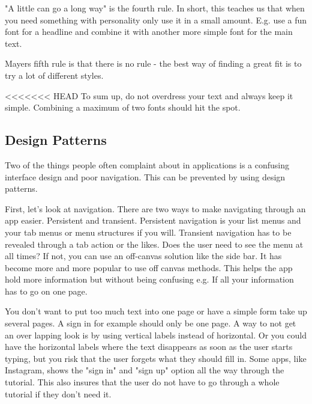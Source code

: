 "A little can go a long way" is the fourth rule. In short, this teaches us that when you need something with personality only use it in a small amount. E.g. use a fun font for a headline and combine it with another more simple font for the main text. 

Mayers fifth rule is that there is no rule - the best way of finding a great fit is to try a lot of different styles. \cite{Font}

<<<<<<< HEAD
To sum up, do not overdress your text and always keep it simple. Combining a maximum of two fonts should hit the spot.\cite{TypeComb} %

\subsection{Design Patterns}
Two of the things people often complaint about in applications is a confusing interface design and poor navigation. \cite{Pattern} This can be prevented by using design patterns. 

First, let's look at navigation. There are two ways to make navigating through an app easier. Persistent and transient. Persistent navigation is your list menus and your tab menus or menu structures if you will. Transient navigation has to be revealed through a tab action or the likes.\cite{Pattern}
Does the user need to see the menu at all times? If not, you can use an off-canvas solution like the side bar. 
It has become more and more popular to use off canvas methods. \cite{Pattern} This helps the app hold more information but without being confusing e.g. If all your information has to go on one page. %

You don't want to put too much text into one page or have a simple form take up several pages. A sign in for example should only be one page. A way to not get an over lapping look is by using vertical labels instead of horizontal. \cite{Pattern} Or you could have the horizontal labels where the text disappears as soon as the user starts typing, but you risk that the user forgets what they should fill in.\cite{Pattern} %
Some apps, like Instagram, shows the "sign in" and "sign up" option all the way through the tutorial. This also insures that the user do not have to go through a whole tutorial if they don't need it. 

